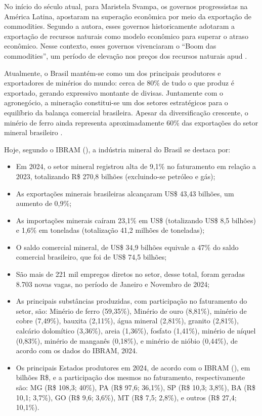No início do século atual, para Maristela Svampa, os governos progressistas na América Latina, apostaram na superação econômica por meio da exportação de commodities. Segundo a autora, esses governos historicamente adotaram a exportação de recursos naturais como modelo econômico para superar o atraso econômico. Nesse contexto, esses governos vivenciaram o ``Boom das commodities'', um período de elevação nos preços dos recursos naturais \cite{svampa2019fronteiras} apud \cite[p. 144]{domingues2022historia}.

Atualmente, o Brasil mantém-se como um dos principais produtores e exportadores de minérios do mundo: cerca de 80\% de tudo o que produz é exportado, gerando expressivo montante de divisas. Juntamente com o agronegócio, a mineração constitui-se um dos setores estratégicos para o equilíbrio da balança comercial brasileira. Apesar da diversificação crescente, o minério de ferro ainda representa aproximadamente 60\% das exportações do setor mineral brasileiro \cite{anm2023informe3}.

Hoje, segundo o IBRAM (\citeyear{ibram2024dados}), a indústria mineral do Brasil se destaca por:

\begin{itemize}
\item Em 2024, o setor mineral registrou alta de 9,1\% no faturamento em relação a 2023, totalizando R\$ 270,8 bilhões (excluindo-se petróleo e gás);

\item As exportações minerais brasileiras alcançaram US\$ 43,43 bilhões, um aumento de 0,9\%;

\item As importações minerais caíram 23,1\% em US\$ (totalizando US\$ 8,5 bilhões) e 1,6\% em toneladas (totalização 41,2 milhões de toneladas);

\item O saldo comercial mineral, de US\$ 34,9 bilhões equivale a 47\% do saldo comercial brasileiro, que foi de US\$ 74,5 bilhões;

\item São mais de 221 mil empregos diretos no setor, desse total, foram geradas 8.703 novas vagas, no período de Janeiro e Novembro de 2024;

\item As principais substâncias produzidas, com participação no faturamento do setor, são: Minério de ferro (59,35\%), Minério de ouro (8,81\%), minério de cobre (7,49\%), bauxita (2,11\%), água mineral (2,81\%), granito (2,81\%), calcário dolomítico (3,36\%), areia (1,36\%), fosfato (1,41\%), minério de níquel (0,83\%), minério de manganês (0,18\%), e minério de nióbio (0,44\%), de acordo com os dados do IBRAM, 2024.

\item Os principais Estados produtores em 2024, de acordo com o IBRAM (\citeyear{ibram2024dados}), em bilhões R\$, e a participação dos mesmos no faturamento,
respectivamente são: MG (R\$ 108,3; 40\%), PA (R\$ 97,6; 36,1\%), SP (R\$ 10,3; 3,8\%), BA (R\$ 10,1; 3,7\%), GO (R\$ 9,6; 3,6\%), MT (R\$ 7,5; 2,8\%), e outros (R\$ 27,4; 10,1\%).
\end{itemize}

